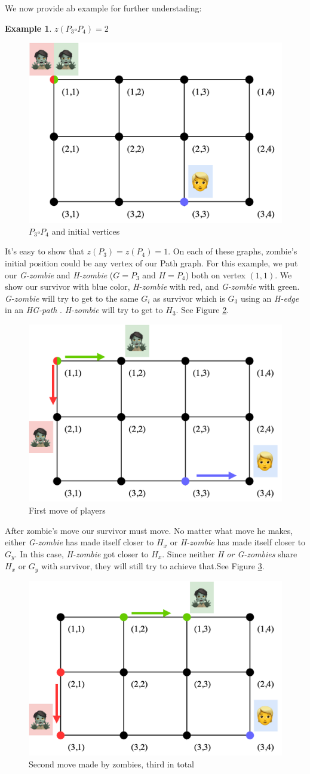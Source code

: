 \documentclass[1p]{elsarticle}
\newtheorem{example}[theorem]{Example}
\begin{document}
We now provide ab example for further understading:
\begin{example} $z(P_3 \square P_4 ) = 2$
	
\end{example}
\begin{figure}[h!]
	\centering
	\includegraphics[width=0.5\linewidth]{fig/p34m1.png}
	\caption{$P_3 \square P_4$ and initial vertices}
	\label{fig:p3}
\end{figure}
It's easy to show that $z(P_3) = z(P_4) = 1$. On each of these graphs, zombie's initial position could be any vertex of
our Path graph. For this example, we put our {\it G-zombie} and {\it H-zombie} ($G = P_3$ and $H = P_4$) both on vertex
$(1,1)$. We show our survivor with blue color, {\it H-zombie} with red, and {\it G-zombie} with green. {\it G-zombie}
will try to get to the same $G_{i}$ as survivor which is $G_3$ using an {\it H-edge} in an {\it HG-path} . {\it
H-zombie} will try to get to $H_3$. See Figure \ref{fig:p4}.
\begin{figure}[h!]
	\centering
	\includegraphics[width=0.5\linewidth]{fig/p34m2.png}
	\caption{First move of players}
	\label{fig:p4}
\end{figure}
After zombie's move our survivor must move. No matter what move he makes, either {\it G-zombie} has made itself closer
to $H_x$ or {\it H-zombie} has made itself closer to $G_y$. In this case, {\it H-zombie} got closer to  $H_x$. Since
neither {\it H or G-zombies}  share $H_x$ or $G_y$ with survivor, they will still try to achieve that.See Figure
\ref{fig:p5}.
\begin{figure}[h!]
	\centering
	\includegraphics[width=0.5\linewidth]{fig/p34m3.png}
	\caption{Second move made by zombies, third in total}
	\label{fig:p5}
\end{figure}
\end{document}
